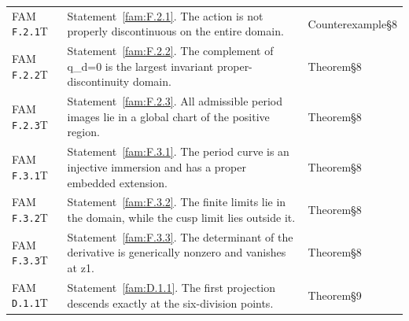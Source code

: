 \documentclass[11pt,a4paper]{article}
\theoremstyle{plain}
\theoremstyle{definition}
\begin{document}
\begin{longtable}{@{}L{.18\linewidth}L{.48\linewidth}L{.29\linewidth}@{}}
FAM \nolinkurl{F.2.1}\newline T & Statement~\ref{fam:F.2.1}. The action is not properly discontinuous on the entire domain.\newline {} & Counterexample\newline §8\\
FAM \nolinkurl{F.2.2}\newline T & Statement~\ref{fam:F.2.2}. The complement of q\_\allowbreak{}d=0 is the largest invariant proper-discontinuity domain.\newline {} & Theorem\newline §8\\
FAM \nolinkurl{F.2.3}\newline T & Statement~\ref{fam:F.2.3}. All admissible period images lie in a global chart of the positive region.\newline {} & Theorem\newline §8\\
FAM \nolinkurl{F.3.1}\newline T & Statement~\ref{fam:F.3.1}. The period curve is an injective immersion and has a proper embedded extension.\newline {} & Theorem\newline §8\\
FAM \nolinkurl{F.3.2}\newline T & Statement~\ref{fam:F.3.2}. The finite limits lie in the domain, while the cusp limit lies outside it.\newline {} & Theorem\newline §8\\
FAM \nolinkurl{F.3.3}\newline T & Statement~\ref{fam:F.3.3}. The determinant of the derivative is generically nonzero and vanishes at z1.\newline {} & Theorem\newline §8\\
FAM \nolinkurl{D.1.1}\newline T & Statement~\ref{fam:D.1.1}. The first projection descends exactly at the six-division points.\newline {} & Theorem\newline §9\\

\end{longtable}
\end{document}
